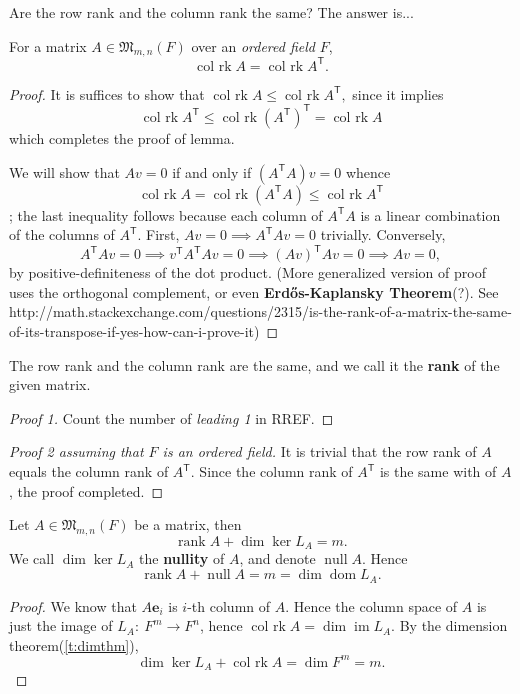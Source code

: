 Are the row rank and the column rank the same? The answer is...

\begin{lemma}For a matrix $A\in\mathfrak M_{m,n}(F)$ over an \emph{ordered field} $F$, $$\operatorname{col~rk}A = \operatorname{col~rk}A^\mathsf T.$$
\end{lemma}
\begin{proof}
It is suffices to show that $\operatorname{col~rk}A \le \operatorname{col~rk}A^\mathsf T,$ since it implies $$\operatorname{col~rk}A^\mathsf T \le \operatorname{col~rk}(A^\mathsf T )^\mathsf T  = \operatorname{col~rk}A$$which completes the proof of lemma.

We will show that $Av = 0$ if and only if $(A^\mathsf T A)v = 0$ whence $$\operatorname{col~rk}A = \operatorname{col~rk}(A^\mathsf T A) \le \operatorname{col~rk}A^\mathsf T$$; the last inequality follows because each column of $A^\mathsf T A$ is a linear combination of the columns of $A^\mathsf T$. First, $Av=0 \implies A^\mathsf T Av = 0$ trivially. Conversely, $$A^\mathsf T Av = 0 \implies v^\mathsf T A^\mathsf T A v = 0 \implies (Av)^\mathsf T Av = 0 \implies Av = 0,$$ by positive-definiteness of the dot product. (More generalized version of proof uses the orthogonal complement, or even \textbf{Erdős-Kaplansky Theorem}(?). See http://math.stackexchange.com/questions/2315/is-the-rank-of-a-matrix-the-same-of-its-transpose-if-yes-how-can-i-prove-it)\end{proof}
\begin{theorem} The row rank and the column rank are the same, and we call it the \textbf{rank} of the given matrix.
\end{theorem}
\begin{proof}[Proof 1]
Count the number of \textit{leading 1} in RREF.
\end{proof}
\begin{proof}[Proof 2 assuming that $F$ is an ordered field]
It is trivial that the row rank of $A$ equals the column rank of $A^\mathsf T.$ Since the column rank of $A^\mathsf T$ is the same with of $A$, the proof completed.
\end{proof}
\begin{theorem}
Let $A\in\mathfrak M_{m,n}(F)$ be a matrix, then $$\operatorname{rank}A + \operatorname{dim}\ker L_A = m.$$ We call $\operatorname{dim}\ker L_A$ the \textbf{nullity} of $A$, and denote $\operatorname{null}A$. Hence $$\operatorname{rank}A + \operatorname{null}A = m = \operatorname{dim}\operatorname{dom}L_A.$$
\end{theorem}
\begin{proof}
We know that $A\mathbf e_i$ is $i$-th column of $A$. Hence the column space of $A$ is just the image of $L_A:~F^m \to F^n$, hence $\operatorname{col~rk} A = \operatorname{dim}\operatorname{im}L_A.$ By the dimension theorem(\cref{t:dimthm}), $$\operatorname{dim}\ker L_A  + \operatorname{col~rk} A = \operatorname{dim} F^m = m.$$\end{proof}

